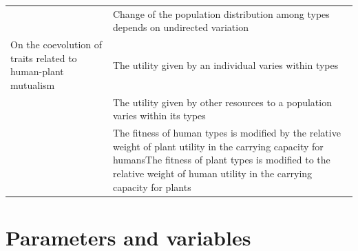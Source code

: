 \documentclass[
]{book}
\begin{document}
\begin{longtable}[]{@{}ll@{}}
\begin{minipage}[t]{0.45\columnwidth}
﻿\strut
\end{minipage} & \begin{minipage}[t]{0.49\columnwidth}\raggedright
Change of the population distribution among types depends on undirected variation\strut
\end{minipage}\tabularnewline
\begin{minipage}[t]{0.45\columnwidth}\raggedright
On the coevolution of traits related to human-plant mutualism\strut
\end{minipage} & \begin{minipage}[t]{0.49\columnwidth}\raggedright
The utility given by an individual varies within types\strut
\end{minipage}\tabularnewline
\begin{minipage}[t]{0.45\columnwidth}\raggedright
﻿\strut
\end{minipage} & \begin{minipage}[t]{0.49\columnwidth}\raggedright
The utility given by other resources to a population varies within its types\strut
\end{minipage}\tabularnewline
\begin{minipage}[t]{0.45\columnwidth}\raggedright
﻿\strut
\end{minipage} & \begin{minipage}[t]{0.49\columnwidth}\raggedright
The fitness of human types is modified by the relative weight of plant utility in the carrying capacity for humansThe fitness of plant types is modified to the relative weight of human utility in the carrying capacity for plants\strut
\end{minipage}\tabularnewline
\bottomrule
\end{longtable}

\newpage

\hypertarget{parameters-and-variables}{%
\section*{Parameters and variables}\label{parameters-and-variables}}
\end{document}
